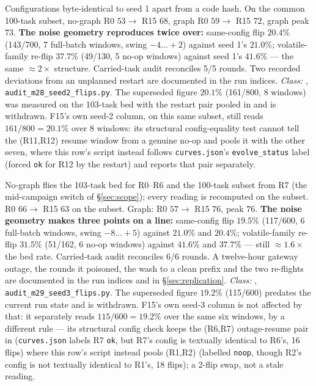 \begin{description}[leftmargin=0pt,labelindent=0pt,labelsep=0pt,style=nextline,font=\normalfont,itemsep=6pt]
\item[\textbf{F44}\quad Replication, seed 2, both arms 16/16.]
Configurations byte-identical to seed 1 apart from a code hash. On the
common 100-task subset, no-graph R0 $53 \to$ R15 $68$, graph R0 $59 \to$
R15 $72$, graph peak $73$.
\textbf{The noise geometry reproduces twice over:} same-config
flip $20.4\%$ (143/700, 7 full-batch windows, swing $-4\ldots{+}2$)
against seed 1's $21.0\%$; volatile-family re-flip $37.7\%$ (49/130, 5
no-op windows) against seed 1's $41.6\%$ --- the same $\approx 2\times$
structure.
Carried-task audit reconciles 5/5 rounds. Two recorded deviations from an
unplanned restart are documented in the run indices.
\emph{Class:} , \texttt{audit\_m28\_seed2\_flips.py}. The
superseded figure $20.1\%$ (161/800, 8 windows) was measured on the
103-task bed with the restart pair pooled in and is withdrawn. F15's own seed-2 column, on this same subset, still reads $161/800=20.1\%$ over 8 windows: its structural config-equality test cannot tell the (R11,R12) resume window from a genuine no-op and pools it with the other seven, where this row's script instead follows \texttt{curves.json}'s \texttt{evolve\_status} label (forced \texttt{ok} for R12 by the restart) and reports that pair separately.

\item[\textbf{F45}\quad Replication, seed 3, both arms 16/16.]
No-graph flies the 103-task bed for R0--R6 and the 100-task subset from R7
(the mid-campaign switch of \S\ref{sec:scope}); every reading is recomputed
on the subset. R0 $66 \to$ R15 $63$ on the subset. Graph: R0 $57 \to$ R15
$76$, peak $76$. \textbf{The noise geometry makes three points on a line:}
same-config flip $19.5\%$ (117/600, 6 full-batch windows, swing
$-8\ldots{+}5$) against $21.0\%$ and $20.4\%$; volatile-family re-flip
$31.5\%$ (51/162, 6 no-op windows) against $41.6\%$ and $37.7\%$ --- still
$\approx 1.6\times$ the bed rate. Carried-task audit reconciles 6/6 rounds.
A twelve-hour gateway outage, the rounds it poisoned, the wash to a clean
prefix and the two re-flights are documented in the run indices and in
\S\ref{sec:replication}. \emph{Class:} ,
\texttt{audit\_m29\_seed3\_flips.py}. The superseded figure $19.2\%$
(115/600) predates the current run state and is withdrawn. F15's own seed-3 column is not affected by that: it separately reads $115/600=19.2\%$ over the same six windows, by a different rule --- its structural config check keeps the (R6,R7) outage-resume pair in (\texttt{curves.json} labels R7 \texttt{ok}, but R7's config is textually identical to R6's, 16 flips) where this row's script instead pools (R1,R2) (labelled \texttt{noop}, though R2's config is not textually identical to R1's, 18 flips); a 2-flip swap, not a stale reading.


\end{description}
